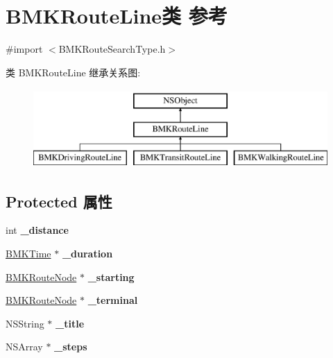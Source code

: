 \hypertarget{interface_b_m_k_route_line}{\section{B\+M\+K\+Route\+Line类 参考}
\label{interface_b_m_k_route_line}
}


{\ttfamily \#import $<$B\+M\+K\+Route\+Search\+Type.\+h$>$}

类 B\+M\+K\+Route\+Line 继承关系图\+:\begin{figure}[H]
\begin{center}
\leavevmode
\includegraphics[height=3.000000cm]{interface_b_m_k_route_line}
\end{center}
\end{figure}
\subsection*{Protected 属性}
\begin{DoxyCompactItemize}
\item 
\hypertarget{interface_b_m_k_route_line_ab4bc6b811527065bb19e0c8d1af822ee}{int {\bfseries \+\_\+distance}}\label{interface_b_m_k_route_line_ab4bc6b811527065bb19e0c8d1af822ee}

\item 
\hypertarget{interface_b_m_k_route_line_ab856ba5b78a2bb4d3625c0cf74b1e427}{\hyperlink{interface_b_m_k_time}{B\+M\+K\+Time} $\ast$ {\bfseries \+\_\+duration}}\label{interface_b_m_k_route_line_ab856ba5b78a2bb4d3625c0cf74b1e427}

\item 
\hypertarget{interface_b_m_k_route_line_adbeb7549910a94f1b6513b124808d57f}{\hyperlink{interface_b_m_k_route_node}{B\+M\+K\+Route\+Node} $\ast$ {\bfseries \+\_\+starting}}\label{interface_b_m_k_route_line_adbeb7549910a94f1b6513b124808d57f}

\item 
\hypertarget{interface_b_m_k_route_line_a42ee9b3affc42d0a25c52fa0dc2d4a8f}{\hyperlink{interface_b_m_k_route_node}{B\+M\+K\+Route\+Node} $\ast$ {\bfseries \+\_\+terminal}}\label{interface_b_m_k_route_line_a42ee9b3affc42d0a25c52fa0dc2d4a8f}

\item 
\hypertarget{interface_b_m_k_route_line_a862b967d37cfd210ba72dcaa6bad75b1}{N\+S\+String $\ast$ {\bfseries \+\_\+title}}\label{interface_b_m_k_route_line_a862b967d37cfd210ba72dcaa6bad75b1}

\item 
\hypertarget{interface_b_m_k_route_line_ad573249944bdb333411aa9ea588b3eb0}{N\+S\+Array $\ast$ {\bfseries \+\_\+steps}}\label{interface_b_m_k_route_line_ad573249944bdb333411aa9ea588b3eb0}

\end{DoxyCompactItemize}
